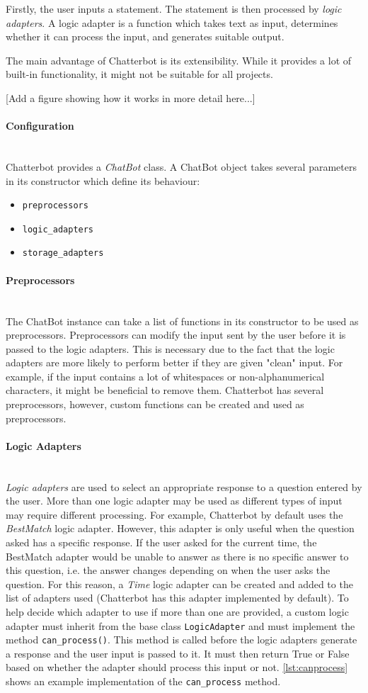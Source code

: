 \documentclass[12pt,a4paper]{article}
\newcommand{\myparagraph}[1]{\paragraph{#1}\mbox{}\\}
\begin{document}
Firstly, the user inputs a statement. The statement is then processed by \textit{logic adapters}. A logic adapter is a function which takes text as input, determines whether it can process the input, and generates suitable output.

The main advantage of Chatterbot is its extensibility. While it provides a lot of built-in functionality, it might not be suitable for all projects.

[Add a figure showing how it works in more detail here...]

\myparagraph{Configuration}
Chatterbot provides a \textit{ChatBot} class. A ChatBot object takes several parameters in its constructor which define its behaviour:
\begin{itemize}
    \item \texttt{preprocessors}
    \item \texttt{logic\_adapters}
    \item \texttt{storage\_adapters}
\end{itemize}

\myparagraph{Preprocessors}
The ChatBot instance can take a list of functions in its constructor to be used as preprocessors. Preprocessors can modify the input sent by the user before it is passed to the logic adapters. This is necessary due to the fact that the logic adapters are more likely to perform better if they are given "clean" input. For example, if the input contains a lot of whitespaces or non-alphanumerical characters, it might be beneficial to remove them. Chatterbot has several preprocessors, however, custom functions can be created and used as preprocessors.

\myparagraph{Logic Adapters}
\textit{Logic adapters} are used to select an appropriate response to a question entered by the user. More than one logic adapter may be used as different types of input may require different processing. For example, Chatterbot by default uses the \textit{BestMatch} logic adapter. However, this adapter is only useful when the question asked has a specific response. If the user asked for the current time, the BestMatch adapter would be unable to answer as there is no specific answer to this question, i.e. the answer changes depending on when the user asks the question. For this reason, a \textit{Time} logic adapter can be created and added to the list of adapters used (Chatterbot has this adapter implemented by default). To help decide which adapter to use if more than one are provided, a custom logic adapter must inherit from the base class \texttt{LogicAdapter} and must implement the method \texttt{can\_process()}. This method is called before the logic adapters generate a response and the user input is passed to it. It must then return True or False based on whether the adapter should process this input or not. \cref{lst:canprocess} shows an example implementation of the \texttt{can\_process} method.
\end{document}
